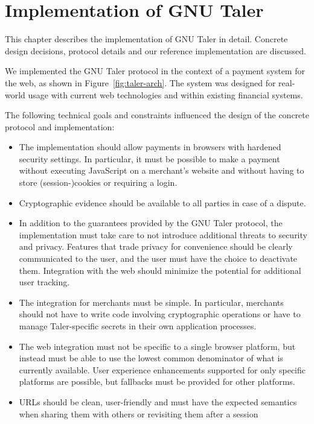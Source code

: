 \chapter{Implementation of GNU Taler}\label{chapter:implementation}

This chapter describes the implementation of GNU Taler in detail.  Concrete
design decisions, protocol details and our reference implementation are
discussed.

We implemented the GNU Taler protocol in the context of a payment system for
the web, as shown in Figure~\ref{fig:taler-arch}.  The system was designed for
real-world usage with current web technologies and within existing
financial systems.

The following technical goals and constraints influenced the design of the
concrete protocol and implementation:
\begin{itemize}
  \item The implementation should allow payments in browsers with hardened
    security settings.  In particular, it must be possible to make a payment
    without executing JavaScript on a merchant's website and without having to
    store (session-)cookies or requiring a login.
  \item Cryptographic evidence should be available to all parties in case of a
    dispute.
  \item In addition to the guarantees provided by the GNU Taler protocol, the
    implementation must take care to not introduce additional threats to
    security and privacy.  Features that trade privacy for convenience should
    be clearly communicated to the user, and the user must have the choice to
    deactivate them.  Integration with the web should minimize the potential
    for additional user tracking.
  \item The integration for merchants must be simple.  In particular, merchants
    should not have to write code involving cryptographic operations or have to
    manage Taler-specific secrets in their own application processes.
  \item The web integration must not be specific to a single browser platform, but
    instead must be able to use the lowest common denominator of what is
    currently available.  User experience enhancements supported for only
    specific platforms are possible, but fallbacks must be provided for other
    platforms.
  \item URLs should be clean, user-friendly and must have the expected
    semantics when sharing them with others or revisiting them after a session

\end{itemize}
